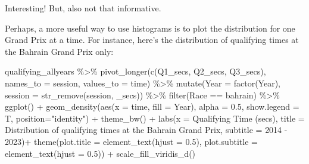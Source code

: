 \documentclass[
]{book}
\newenvironment{Shaded}{\begin{snugshade}}{\end{snugshade}}
\newcommand{\AttributeTok}[1]{\textcolor[rgb]{0.77,0.63,0.00}{#1}}
\newcommand{\FloatTok}[1]{\textcolor[rgb]{0.00,0.00,0.81}{#1}}
\newcommand{\FunctionTok}[1]{\textcolor[rgb]{0.00,0.00,0.00}{#1}}
\newcommand{\NormalTok}[1]{#1}
\newcommand{\SpecialCharTok}[1]{\textcolor[rgb]{0.00,0.00,0.00}{#1}}
\newcommand{\StringTok}[1]{\textcolor[rgb]{0.31,0.60,0.02}{#1}}
\begin{document}
Interesting! But, also not that informative.

Perhaps, a more useful way to use histograms is to plot the distribution for one Grand Prix at a time. For instance, here's the distribution of qualifying times at the Bahrain Grand Prix only:

\begin{Shaded}
\begin{Highlighting}[]
\NormalTok{qualifying\_allyears }\SpecialCharTok{\%\textgreater{}\%}
  \FunctionTok{pivot\_longer}\NormalTok{(}\FunctionTok{c}\NormalTok{(}\StringTok{\textquotesingle{}Q1\_secs\textquotesingle{}}\NormalTok{, }\StringTok{\textquotesingle{}Q2\_secs\textquotesingle{}}\NormalTok{, }\StringTok{\textquotesingle{}Q3\_secs\textquotesingle{}}\NormalTok{),}
               \AttributeTok{names\_to =} \StringTok{\textquotesingle{}session\textquotesingle{}}\NormalTok{,}
               \AttributeTok{values\_to =} \StringTok{\textquotesingle{}time\textquotesingle{}}\NormalTok{) }\SpecialCharTok{\%\textgreater{}\%}
  \FunctionTok{mutate}\NormalTok{(}\AttributeTok{Year =} \FunctionTok{factor}\NormalTok{(Year),}
         \AttributeTok{session =} \FunctionTok{str\_remove}\NormalTok{(session, }\StringTok{\textquotesingle{}\_secs\textquotesingle{}}\NormalTok{)) }\SpecialCharTok{\%\textgreater{}\%}
  \FunctionTok{filter}\NormalTok{(Race }\SpecialCharTok{==} \StringTok{\textquotesingle{}bahrain\textquotesingle{}}\NormalTok{) }\SpecialCharTok{\%\textgreater{}\%}
  \FunctionTok{ggplot}\NormalTok{() }\SpecialCharTok{+}
  \FunctionTok{geom\_density}\NormalTok{(}\FunctionTok{aes}\NormalTok{(}\AttributeTok{x =}\NormalTok{ time, }\AttributeTok{fill =}\NormalTok{ Year),}
                 \AttributeTok{alpha =} \FloatTok{0.5}\NormalTok{, }\AttributeTok{show.legend =}\NormalTok{ T,}
                 \AttributeTok{position=}\StringTok{"identity"}\NormalTok{) }\SpecialCharTok{+}
  \FunctionTok{theme\_bw}\NormalTok{() }\SpecialCharTok{+}
  \FunctionTok{labs}\NormalTok{(}\AttributeTok{x =} \StringTok{\textquotesingle{}Qualifying Time (secs)\textquotesingle{}}\NormalTok{,}
       \AttributeTok{title =} \StringTok{\textquotesingle{}Distribution of qualifying times at the Bahrain Grand Prix\textquotesingle{}}\NormalTok{,}
       \AttributeTok{subtitle =} \StringTok{\textquotesingle{}2014 {-} 2023\textquotesingle{}}\NormalTok{)}\SpecialCharTok{+}
  \FunctionTok{theme}\NormalTok{(}\AttributeTok{plot.title =} \FunctionTok{element\_text}\NormalTok{(}\AttributeTok{hjust =} \FloatTok{0.5}\NormalTok{),}
        \AttributeTok{plot.subtitle =} \FunctionTok{element\_text}\NormalTok{(}\AttributeTok{hjust =} \FloatTok{0.5}\NormalTok{)) }\SpecialCharTok{+}
  \FunctionTok{scale\_fill\_viridis\_d}\NormalTok{()}
\end{Highlighting}
\end{Shaded}
\end{document}
